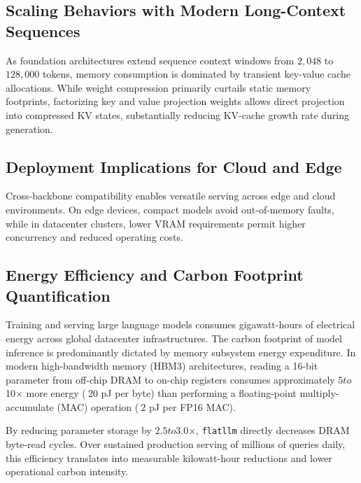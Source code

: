 \subsection{Scaling Behaviors with Modern Long-Context Sequences}
As foundation architectures extend sequence context windows from $2{,}048$ to $128{,}000$ tokens, memory consumption is dominated by transient key-value cache allocations. While weight compression primarily curtails static memory footprints, factorizing key and value projection weights allows direct projection into compressed KV states, substantially reducing KV-cache growth rate during generation.

\subsection{Deployment Implications for Cloud and Edge}
Cross-backbone compatibility enables versatile serving across edge and cloud environments. On edge devices, compact models avoid out-of-memory faults, while in datacenter clusters, lower VRAM requirements permit higher concurrency and reduced operating costs.

\subsection{Energy Efficiency and Carbon Footprint Quantification}
Training and serving large language models consumes gigawatt-hours of electrical energy across global datacenter infrastructures. The carbon footprint of model inference is predominantly dictated by memory subsystem energy expenditure. In modern high-bandwidth memory (HBM3) architectures, reading a 16-bit parameter from off-chip DRAM to on-chip registers consumes approximately $5$\times$ to $10$\times$ more energy ($~20$ pJ per byte) than performing a floating-point multiply-accumulate (MAC) operation ($~2$ pJ per FP16 MAC).

By reducing parameter storage by $2.5$\times$ to $3.0$\times$, \texttt{flatllm} directly decreases DRAM byte-read cycles. Over sustained production serving of millions of queries daily, this efficiency translates into measurable kilowatt-hour reductions and lower operational carbon intensity.
